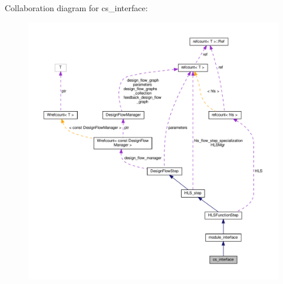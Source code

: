 Collaboration diagram for cs\+\_\+interface\+:
\nopagebreak
\begin{figure}[H]
\begin{center}
\leavevmode
\includegraphics[width=350pt]{d7/d9a/classcs__interface__coll__graph}
\end{center}
\end{figure}
